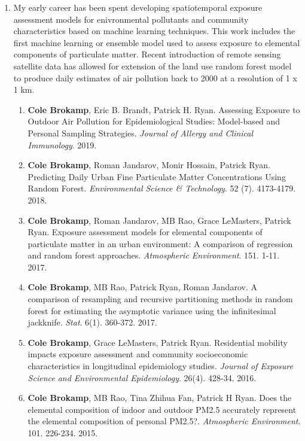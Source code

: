 \documentclass{nihbiosketch}
\begin{document}
\begin{enumerate}

\item My early career has been spent developing spatiotemporal exposure assessment models for
  enivronmental pollutants and community characteristics based on machine learning
  techniques.  This work includes the first machine
  learning or ensemble model used to assess exposure to elemental components of
  particulate matter. Recent introduction of remote sensing satellite data has
  allowed for extension of the land use random forest model to produce daily
  estimates of air pollution back to 2000 at a resolution of 1 x 1 km.

\begin{enumerate}
	
  \item \textbf{Cole Brokamp}, Eric B. Brandt, Patrick H. Ryan. Assessing
  Exposure to Outdoor Air Pollution for Epidemiological Studies:
  Model-based and Personal Sampling Strategies. \emph{Journal of Allergy
    and Clinical Immunology}. 2019.

	\item \textbf{Cole Brokamp}, Roman Jandarov, Monir Hossain, Patrick Ryan. Predicting Daily Urban Fine Particulate Matter Concentrations Using Random Forest. \textit{Environmental Science \& Technology}. 52 (7). 4173-4179. 2018.

	\item \textbf{Cole Brokamp}, Roman Jandarov, MB Rao, Grace LeMasters, Patrick Ryan. Exposure assessment models for elemental components of particulate matter in an urban environment: A comparison of regression and random forest approaches. \textit{Atmospheric Environment}. 151. 1-11. 2017.
	
	\item \textbf{Cole Brokamp}, MB Rao, Patrick Ryan, Roman Jandarov. A comparison of resampling and recursive partitioning methods in random forest for estimating the asymptotic variance using the infinitesimal jackknife. \textit{Stat}. 6(1). 360-372. 2017.

  \item \textbf{Cole Brokamp}, Grace LeMasters, Patrick Ryan. Residential
    mobility impacts exposure assessment and community socioeconomic
    characteristics in longitudinal epidemiology studies. \emph{Journal of
      Exposure Science and Environmental Epidemiology}. 26(4). 428-34. 2016.

  \item \textbf{Cole Brokamp}, MB Rao, Tina Zhihua Fan, Patrick H Ryan. Does the
    elemental composition of indoor and outdoor PM2.5 accurately represent
    the elemental composition of personal PM2.5?. \emph{Atmospheric
      Environment}. 101. 226-234. 2015.


\end{enumerate}
\end{enumerate}
\end{document}
